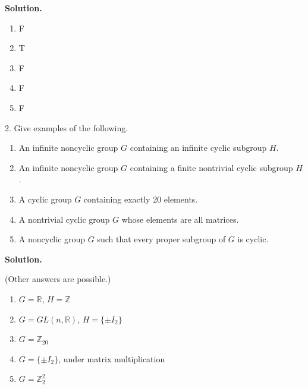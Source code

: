 \documentclass[10pt,]{book}
\theoremstyle{plain}
\theoremstyle{definition}
\theoremstyle{definition}
\theoremstyle{definition}
\theoremstyle{definition}
\numberwithin{equation}{section}
\def\Z{\mathbb{Z}}
\def\R{\mathbb{R}}
\begin{document}
\begin{exerciselist}
\par\smallskip
\par\smallskip
\noindent\textbf{Solution.}\hypertarget{solution-34}{}\quad
\leavevmode%
\begin{multicols}{5}
\begin{enumerate}[label=(\alph*)]
\item\hypertarget{li-268}{}
          F
\item\hypertarget{li-269}{}
          T
\item\hypertarget{li-270}{}
          F
\item\hypertarget{li-271}{}
          F
\item\hypertarget{li-272}{}
          F
\end{enumerate}
\end{multicols}
\item[2.]\hypertarget{exercise-35}{}
        Give examples of the following.
        \leavevmode%
\begin{enumerate}[label=(\alph*)]
\item\hypertarget{li-273}{}
              An infinite noncyclic group \(G\) containing an infinite cyclic subgroup \(H\).
\item\hypertarget{li-274}{}
              An infinite noncyclic group \(G\) containing a finite nontrivial cyclic subgroup \(H\).
\item\hypertarget{li-275}{}
              A cyclic group \(G\) containing exactly 20 elements.
\item\hypertarget{li-276}{}
              A nontrivial cyclic group \(G\) whose elements are all matrices.
\item\hypertarget{li-277}{}
              A noncyclic group \(G\) such that every proper subgroup of \(G\) is cyclic.
\end{enumerate}

\par\smallskip
\par\smallskip
\noindent\textbf{Solution.}\hypertarget{solution-35}{}\quad

      (Other answers are possible.)
      \leavevmode%
\begin{enumerate}[label=(\alph*)]
\item\hypertarget{li-278}{}
            \(G=\R\), \(H=\Z\)
\item\hypertarget{li-279}{}
            \(G=GL(n,\R)\), \(H=\{\pm I_2\}\)
\item\hypertarget{li-280}{}
            \(G=\Z_{20}\)
\item\hypertarget{li-281}{}
            \(G=\{\pm I_2\}\), under matrix multiplication
\item\hypertarget{li-282}{}
            \(G=\Z_2^2\)
\end{enumerate}


\end{exerciselist}
\end{document}
